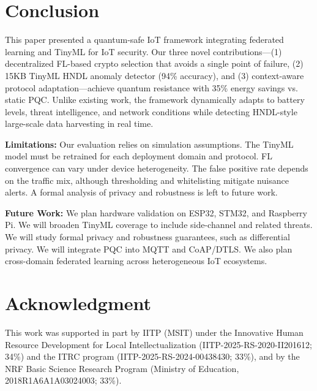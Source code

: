 \documentclass[conference]{IEEEtran}
\begin{document}

\section{Conclusion}

This paper presented a quantum-safe IoT framework integrating federated learning and TinyML for IoT security. Our three novel contributions—(1) decentralized FL-based crypto selection that avoids a single point of failure, (2) 15KB TinyML HNDL anomaly detector (94\% accuracy), and (3) context-aware protocol adaptation—achieve quantum resistance with 35\% energy savings vs. static PQC. Unlike existing work, the framework dynamically adapts to battery levels, threat intelligence, and network conditions while detecting HNDL-style large-scale data harvesting in real time.

\textbf{Limitations:} Our evaluation relies on simulation assumptions. The TinyML model must be retrained for each deployment domain and protocol. FL convergence can vary under device heterogeneity. The false positive rate depends on the traffic mix, although thresholding and whitelisting mitigate nuisance alerts. A formal analysis of privacy and robustness is left to future work.

\textbf{Future Work:} We plan hardware validation on ESP32, STM32, and Raspberry Pi. We will broaden TinyML coverage to include side-channel and related threats. We will study formal privacy and robustness guarantees, such as differential privacy. We will integrate PQC into MQTT and CoAP/DTLS. We also plan cross-domain federated learning across heterogeneous IoT ecosystems.

\section*{Acknowledgment}
This work was supported in part by IITP (MSIT) under the Innovative Human Resource Development for Local Intellectualization (IITP-2025-RS-2020-II201612; 34\%) and the ITRC program (IITP-2025-RS-2024-00438430; 33\%), and by the NRF Basic Science Research Program (Ministry of Education, 2018R1A6A1A03024003; 33\%).



\end{document}
